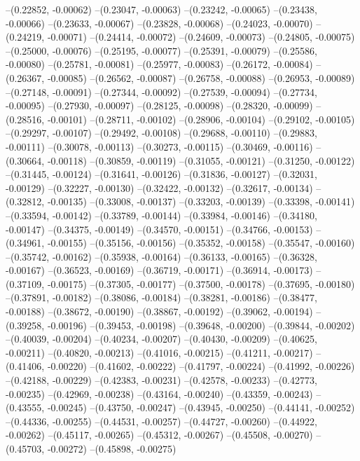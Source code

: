 --(0.22852, -0.00062)
--(0.23047, -0.00063)
--(0.23242, -0.00065)
--(0.23438, -0.00066)
--(0.23633, -0.00067)
--(0.23828, -0.00068)
--(0.24023, -0.00070)
--(0.24219, -0.00071)
--(0.24414, -0.00072)
--(0.24609, -0.00073)
--(0.24805, -0.00075)
--(0.25000, -0.00076)
--(0.25195, -0.00077)
--(0.25391, -0.00079)
--(0.25586, -0.00080)
--(0.25781, -0.00081)
--(0.25977, -0.00083)
--(0.26172, -0.00084)
--(0.26367, -0.00085)
--(0.26562, -0.00087)
--(0.26758, -0.00088)
--(0.26953, -0.00089)
--(0.27148, -0.00091)
--(0.27344, -0.00092)
--(0.27539, -0.00094)
--(0.27734, -0.00095)
--(0.27930, -0.00097)
--(0.28125, -0.00098)
--(0.28320, -0.00099)
--(0.28516, -0.00101)
--(0.28711, -0.00102)
--(0.28906, -0.00104)
--(0.29102, -0.00105)
--(0.29297, -0.00107)
--(0.29492, -0.00108)
--(0.29688, -0.00110)
--(0.29883, -0.00111)
--(0.30078, -0.00113)
--(0.30273, -0.00115)
--(0.30469, -0.00116)
--(0.30664, -0.00118)
--(0.30859, -0.00119)
--(0.31055, -0.00121)
--(0.31250, -0.00122)
--(0.31445, -0.00124)
--(0.31641, -0.00126)
--(0.31836, -0.00127)
--(0.32031, -0.00129)
--(0.32227, -0.00130)
--(0.32422, -0.00132)
--(0.32617, -0.00134)
--(0.32812, -0.00135)
--(0.33008, -0.00137)
--(0.33203, -0.00139)
--(0.33398, -0.00141)
--(0.33594, -0.00142)
--(0.33789, -0.00144)
--(0.33984, -0.00146)
--(0.34180, -0.00147)
--(0.34375, -0.00149)
--(0.34570, -0.00151)
--(0.34766, -0.00153)
--(0.34961, -0.00155)
--(0.35156, -0.00156)
--(0.35352, -0.00158)
--(0.35547, -0.00160)
--(0.35742, -0.00162)
--(0.35938, -0.00164)
--(0.36133, -0.00165)
--(0.36328, -0.00167)
--(0.36523, -0.00169)
--(0.36719, -0.00171)
--(0.36914, -0.00173)
--(0.37109, -0.00175)
--(0.37305, -0.00177)
--(0.37500, -0.00178)
--(0.37695, -0.00180)
--(0.37891, -0.00182)
--(0.38086, -0.00184)
--(0.38281, -0.00186)
--(0.38477, -0.00188)
--(0.38672, -0.00190)
--(0.38867, -0.00192)
--(0.39062, -0.00194)
--(0.39258, -0.00196)
--(0.39453, -0.00198)
--(0.39648, -0.00200)
--(0.39844, -0.00202)
--(0.40039, -0.00204)
--(0.40234, -0.00207)
--(0.40430, -0.00209)
--(0.40625, -0.00211)
--(0.40820, -0.00213)
--(0.41016, -0.00215)
--(0.41211, -0.00217)
--(0.41406, -0.00220)
--(0.41602, -0.00222)
--(0.41797, -0.00224)
--(0.41992, -0.00226)
--(0.42188, -0.00229)
--(0.42383, -0.00231)
--(0.42578, -0.00233)
--(0.42773, -0.00235)
--(0.42969, -0.00238)
--(0.43164, -0.00240)
--(0.43359, -0.00243)
--(0.43555, -0.00245)
--(0.43750, -0.00247)
--(0.43945, -0.00250)
--(0.44141, -0.00252)
--(0.44336, -0.00255)
--(0.44531, -0.00257)
--(0.44727, -0.00260)
--(0.44922, -0.00262)
--(0.45117, -0.00265)
--(0.45312, -0.00267)
--(0.45508, -0.00270)
--(0.45703, -0.00272)
--(0.45898, -0.00275)
